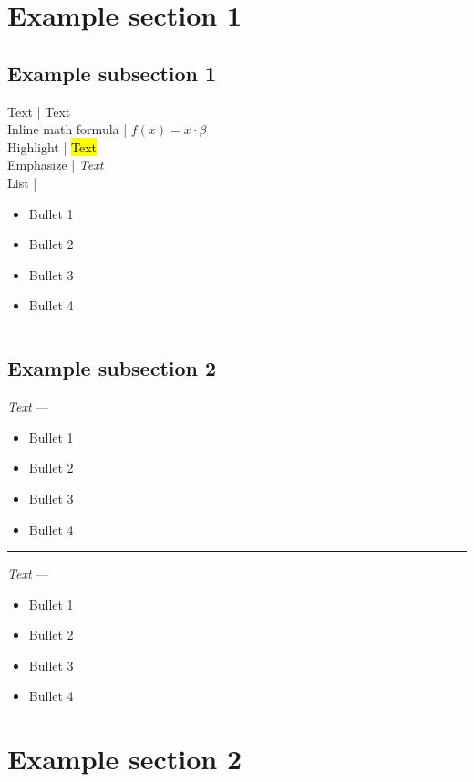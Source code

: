 \section{Example section 1}
\subsection*{Example subsection 1}
Text | Text\\
Inline math formula | $f(x) = x \cdot \beta$\\
Highlight | \hl{Text}\\
Emphasize | \emph{Text}\\
List | 
\begin{multicols}{2}
\begin{itemize}
    \item Bullet 1
    \item Bullet 2
    \item Bullet 3
    \item Bullet 4
\end{itemize}
\end{multicols}

{\color{black}\hrule height 0.001mm}

\subsection*{Example subsection 2}
\emph{Text} --- 
\begin{multicols}{2}
\begin{itemize}
    \item Bullet 1
    \item Bullet 2
    \item Bullet 3
    \item Bullet 4
\end{itemize}
\end{multicols}

{\color{lightgray}\hrule height 0.001mm}

\emph{Text} --- 
\begin{multicols}{2}
\begin{itemize}
    \item Bullet 1
    \item Bullet 2
    \item Bullet 3
    \item Bullet 4
\end{itemize}
\end{multicols}

\section{Example section 2}

